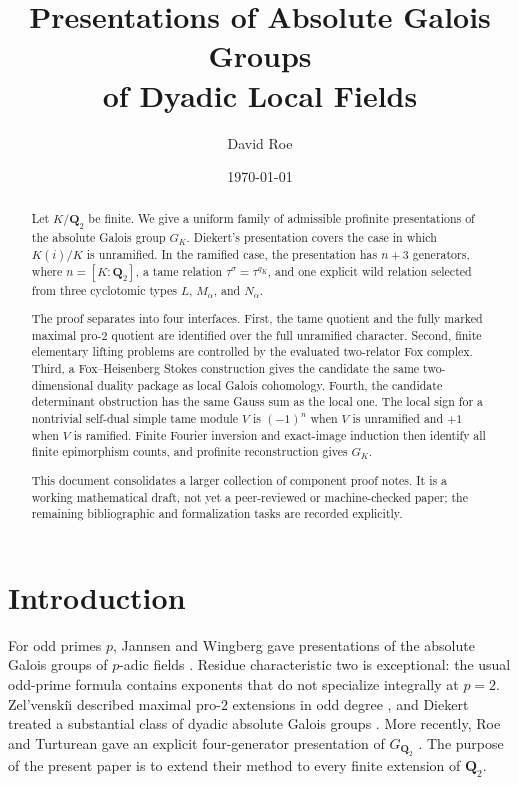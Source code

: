 \documentclass[11pt,reqno]{amsart}
\title[Dyadic absolute Galois presentations]
{Presentations of Absolute Galois Groups\\of Dyadic Local Fields}
\author{David Roe}
\date{\today}
\theoremstyle{definition}
\theoremstyle{remark}
\numberwithin{equation}{section}
\newcommand{\Q}{\mathbf Q}
\begin{document}
\begin{abstract}
Let \(K/\Q_2\) be finite.  We give a uniform family of admissible
profinite presentations of the absolute Galois group \(G_K\).  Diekert's
presentation covers the case in which \(K(i)/K\) is unramified.  In the
ramified case, the presentation has \(n+3\) generators, where
\(n=[K:\Q_2]\), a tame relation
\(\tau^\sigma=\tau^{q_K}\), and one explicit wild relation selected from
three cyclotomic types \(L\), \(M_\alpha\), and \(N_\alpha\).

The proof separates into four interfaces.  First, the tame quotient and
the fully marked maximal pro-\(2\) quotient are identified over the full
unramified character.  Second, finite elementary lifting problems are
controlled by the evaluated two-relator Fox complex.  Third, a
Fox--Heisenberg Stokes construction gives the candidate the same
two-dimensional duality package as local Galois cohomology.  Fourth, the
candidate determinant obstruction has the same Gauss sum as the local
one.  The local sign for a nontrivial self-dual simple tame module \(V\)
is \((-1)^n\) when \(V\) is unramified and \(+1\) when \(V\) is ramified.
Finite Fourier inversion and exact-image induction then identify all
finite epimorphism counts, and profinite reconstruction gives
\(G_K\).

This document consolidates a larger collection of component proof notes.
It is a working mathematical draft, not yet a peer-reviewed or
machine-checked paper; the remaining bibliographic and formalization
tasks are recorded explicitly.
\end{abstract}

\maketitle
\tableofcontents

\section{Introduction}

For odd primes \(p\), Jannsen and Wingberg gave presentations of the
absolute Galois groups of \(p\)-adic fields
\cite{JannsenWingberg1982,NSW}.  Residue characteristic two is exceptional:
the usual odd-prime formula contains exponents that do not specialize
integrally at \(p=2\).  Zel'venski\u{\i} described maximal pro-\(2\)
extensions in odd degree \cite{Zelvenskii1972}, and Diekert treated a
substantial class of dyadic absolute Galois groups
\cite{Diekert1984}.  More recently, Roe and Turturean gave an explicit
four-generator presentation of \(G_{\Q_2}\)
\cite{RoeTurturean2026}.  The purpose of the present paper is to extend
their method to every finite extension of \(\Q_2\).
\end{document}
